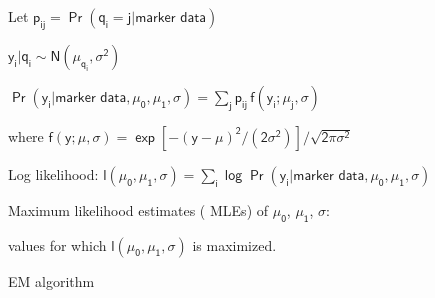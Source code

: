 \documentclass[12pt]{article}
\newcommand{\headsize}{\fontsize{35}{35} \selectfont}
\newcommand{\smallsize}{\fontsize{25}{30} \selectfont}
\begin{document}
\hfill \begin{minipage}{10in}
\color{mywhite} \smallsize
 Let $\mathsf{p_{ij} = \Pr(q_i = j | \text{marker data})}$
\vspace{10mm}

 $\mathsf{y_i | q_i \sim N(\mu_{q_i},\sigma^2)}$
\vspace{10mm}

 $\mathsf{\Pr(y_i | \text{marker data},\mu_0,\mu_1,\sigma) =
\sum_j p_{ij} \, f(y_i; \mu_j,\sigma)}$
\vspace{10mm}

\hspace{15mm} where $\mathsf{f(y; \mu,\sigma)= \exp[-(y-\mu)^2/(2\sigma^2)] / \sqrt{2 \pi
\sigma^2}}$
\vspace{15mm}

 {\color{mypink} Log likelihood}: \hspace{5mm}
$\mathsf{l(\mu_0,\mu_1,\sigma) = \sum_i \log \Pr(y_i | \text{marker
data},\mu_0,\mu_1,\sigma)}$
\vspace{10mm}

 Maximum likelihood estimates ({\color{mypink} MLEs})
of $\mathsf{\mu_0}$, $\mathsf{\mu_1}$, $\mathsf{\sigma}$:
\vspace{5mm}

\hspace{15mm} values for which $\mathsf{l(\mu_0,\mu_1,\sigma)}$ is maximized.
\end{minipage}

\newpage

\headsize \color{myyellow}
\hfill \begin{minipage}{5.75in}
\centering
EM algorithm
\end{minipage}

\vspace{15mm}
\end{document}
